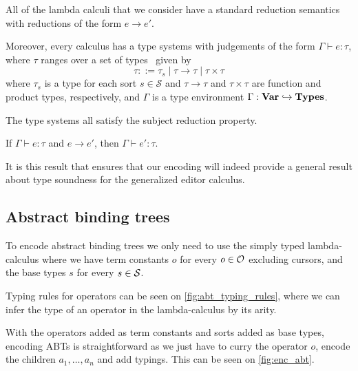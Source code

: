 \documentclass[sigplan,review]{acmart}
\begin{document}
 All of the lambda calculi that we consider have a
 standard reduction semantics with reductions of the form $e \to
 e'$.

 Moreover, every calculus has a type systems with judgements of the
 form $\Gamma \vdash e : \tau$, where $\tau$ ranges over a set of
 types \Types\ given by
%
\[  \tau ::= \tau_s \mid \tau \to \tau \mid \tau \times \tau  \]
%
where $\tau_s$ is a type for each sort $s \in \mathcal{S}$ and $\tau
\to \tau$ and $\tau \times \tau$ are function and product types,
respectively, and $\Gamma$ is a type environment
 $\Gamma : \textbf{Var} \hookrightarrow \textbf{Types}$. 

 The type systems all satisfy the subject
 reduction property.

 \begin{theorem}\label{thm:subred}
   If $\Gamma \vdash e : \tau$ and $e \to e'$, then $\Gamma \vdash e'
   : \tau$.
 \end{theorem}

 It is this result that ensures that our encoding will indeed provide
 a general result about type soundness for the generalized editor
 calculus.
 
\subsection{Abstract binding trees}

To encode abstract binding trees we only need to use the simply typed
lambda-calculus where we have term constants $o$ for every $o \in \mathcal{O}$
excluding cursors, and the base types $s$ for every $s \in \mathcal{S}$.

Typing rules for operators can be seen on \cref{fig:abt_typing_rules},
where we can infer the type of an operator in the lambda-calculus by
its arity.  

With the operators added as term constants and sorts added as base
types, encoding ABTs is straightforward as we just have to curry the
operator $o$, encode the children $a_1, \dots, a_n$ and add
typings. This can be seen on \cref{fig:enc_abt}. 

\end{document}
